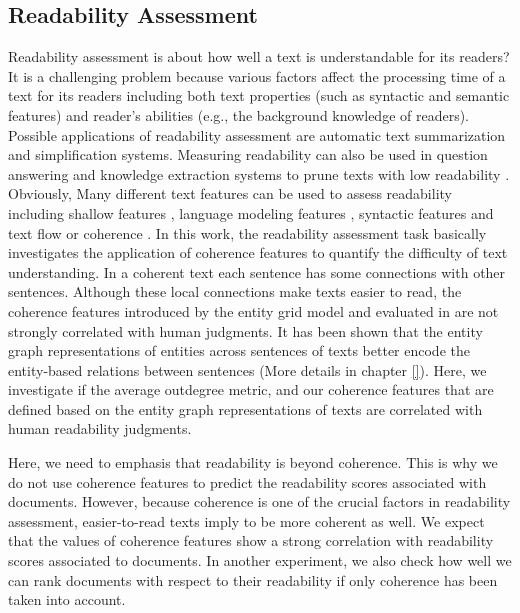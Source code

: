 \subsection{Readability Assessment}
\label{subsec:readability_assessment}
%
Readability assessment is about how well a text is understandable for its readers? 
It is a challenging problem because various factors affect the processing time of a text for its readers including both text properties (such as syntactic and semantic features) and reader's abilities (e.g., the background knowledge of readers). 
Possible applications of readability assessment are automatic text summarization and simplification systems. 
Measuring readability can also be used in question answering and knowledge extraction systems to prune texts with low readability \cite{kate10}.
Obviously, Many different text features can be used to assess readability including shallow features \cite{flesch48,kincaid75}, language modeling features \cite{siluo01,collins-thompson04}, syntactic features \cite{schwarm05} and text flow or coherence \cite{barzilay08,pitler08}.
In this work, the readability assessment task  basically investigates the application of coherence features to quantify the difficulty of text understanding.  
In a coherent text each sentence has some connections with other sentences. 
Although these local connections make texts easier to read, the coherence features introduced by the entity grid model \cite{barzilay08b} and evaluated in  are not strongly correlated with human judgments. 
It has been shown that the entity graph representations of entities across sentences of texts better encode the entity-based relations between sentences (More details in  chapter \ref{}). 
Here, we investigate if the average outdegree metric, and our coherence features that are defined based on the entity graph representations of texts are correlated with human readability judgments. 

Here, we need to emphasis that readability is beyond coherence. 
This is why we do not use coherence features to predict the  readability scores associated with documents. 
However, because coherence is one of the crucial factors in readability assessment, easier-to-read texts imply to be more coherent as well. 
We expect that the values of coherence features show a strong correlation with readability scores associated to documents. 
In another experiment, we also check how well we can rank documents with respect to their readability if only coherence has been taken into account. 

